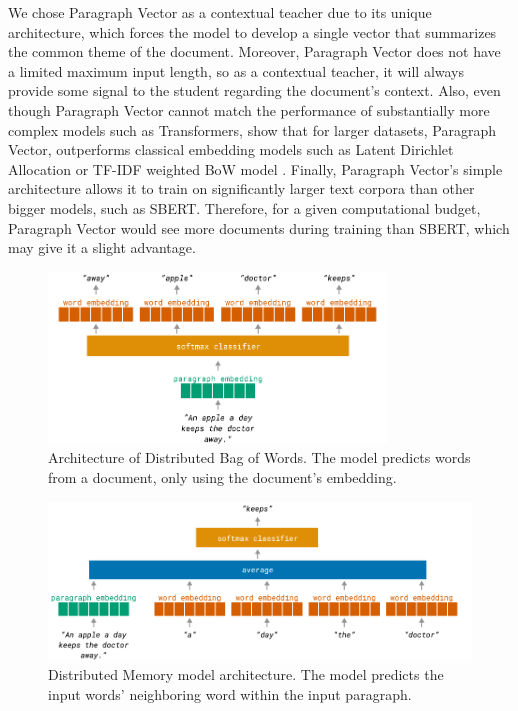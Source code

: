 We chose Paragraph Vector as a contextual teacher due to its unique
architecture, which forces the model to develop a single vector that summarizes
the common theme of the document. Moreover, Paragraph Vector does not have a
limited maximum input length, so as a contextual teacher, it will always
provide some signal to the student regarding the document's context. Also, even
though Paragraph Vector cannot match the performance of substantially more
complex models such as Transformers, \cite{dai2015document} show that for
larger datasets, Paragraph Vector, outperforms classical embedding models such
as Latent Dirichlet Allocation \citep{blei2003latent} or TF-IDF weighted BoW
model \citep{harris1954distributional}. Finally, Paragraph Vector's simple
architecture allows it to train on significantly larger text corpora than other
bigger models, such as SBERT. Therefore, for a given computational budget,
Paragraph Vector would see more documents during training than SBERT, which may
give it a slight advantage.

\begin{figure}
  \centering
  \includegraphics[width=0.8\textwidth]{./img/dbow_architecture.pdf}

  \caption{Architecture of Distributed Bag of Words. The model predicts words
  from a document, only using the document's embedding.}

  \label{fig:dbow}
\end{figure}

\begin{figure}
  \centering
  \includegraphics[width=1\textwidth]{./img/dm_architecture.pdf}

  \caption{Distributed Memory model architecture. The model predicts the input
  words' neighboring word within the input paragraph.}

  \label{fig:dm}

\end{figure}

